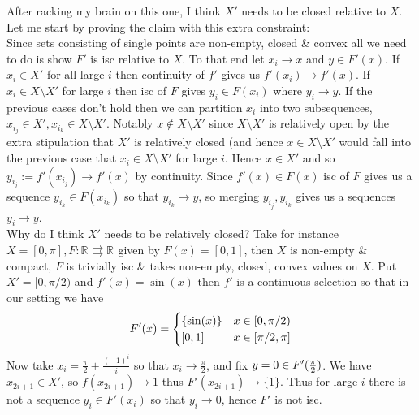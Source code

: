 \documentclass{article}
\newenvironment{ex}[1]
  {\renewcommand\theexercise{#1}\exercise}
  {\endexercise}
\newcommand{\R}[1]{\mathbb{R}^{#1}}
\begin{document}
\begin{ex}{4.27} %
  After racking my brain on this one, I think $X'$ needs to be closed relative to $X$. Let me start by proving the claim with this extra constraint: \, \\

  Since sets consisting of single points are non-empty, closed \& convex all we need to do is show $F'$ is isc relative to $X$. To that end let $x_i \to x$ and $y \in F'(x)$. If $x_i \in X'$ for all large $i$ then continuity of $f'$ gives us $f'(x_i) \to f'(x)$. If $x_i \in X \setminus X'$ for large $i$ then isc of $F$ gives $y_i \in F(x_i)$ where $y_i \to y$. If the previous cases don't hold then we can partition $x_i$ into two subsequences, $x_{i_j} \in X', x_{i_k} \in X \setminus X'$. Notably $x \not\in X \setminus X'$ since $X \setminus X'$ is relatively open by the extra stipulation that $X'$ is relatively closed (and hence $x \in X \setminus X'$ would fall into the previous case that $x_i \in X \setminus X'$ for large $i$. Hence $x \in X'$ and so $y_{i_j} := f'(x_{i_j}) \to f'(x)$ by continuity. Since $f'(x) \in F(x)$ isc of $F$ gives us a sequence $y_{i_k} \in F(x_{i_k})$ so that $y_{i_k} \to y$, so merging $y_{i_j}, y_{i_k}$ gives us a sequences $y_i \to y$.
  \, \\

  Why do I think $X'$ needs to be relatively closed? Take for instance $X = [0, \pi], F : \R{} \rightrightarrows \R{}$ given by $F(x) = [0, 1]$, then $X$ is non-empty \& compact, $F$ is trivially isc \& takes non-empty, closed, convex values on $X$. Put $X' = [0, \pi/2)$ and $f'(x) = \sin(x)$ then $f'$ is a continuous selection so that in our setting we have
  $$
  F'(x) = \begin{cases}
    \{\sin(x)\} & x \in [0, \pi/2) \\
    [0, 1] & x \in [\pi/2, \pi]
  \end{cases}
  $$
  Now take $x_i = \frac{\pi}{2} + \frac{(-1)^i}{i}$ so that $x_i \to \frac{\pi}{2}$, and fix $y = 0 \in F'(\frac{\pi}{2})$. We have $x_{2i+1} \in X'$, so $f(x_{2i+1}) \to 1$ thus $F'(x_{2i+1}) \to \{1\}$. Thus for large $i$ there is not a sequence $y_i \in F'(x_i)$ so that $y_i \to 0$, hence $F'$ is not isc.
\end{ex} %
\end{document}
